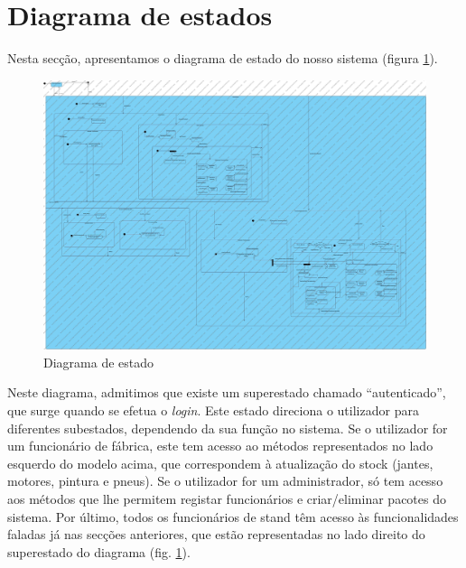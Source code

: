 \section{Diagrama de estados}

Nesta secção, apresentamos o diagrama de estado do nosso sistema (figura \ref{fig:diagrama_de_estado}).

\begin{figure}[h]
    \centering
    \includegraphics[width=\textwidth]{analise_de_requisitos/49461754_398655354223097_8464874533138989056_n.jpg}
    \caption{Diagrama de estado}
    \label{fig:diagrama_de_estado}
\end{figure}


Neste diagrama, admitimos que existe um superestado chamado “autenticado”, que surge quando se efetua o \textit{login}. Este estado direciona o utilizador para diferentes subestados, dependendo da sua função no sistema. Se o utilizador for um funcionário de fábrica, este tem acesso ao métodos representados no lado esquerdo do modelo acima, que correspondem à atualização do stock (jantes, motores, pintura e pneus). Se o utilizador for um administrador, só tem acesso aos métodos que lhe permitem registar funcionários e criar/eliminar pacotes do sistema. Por último, todos os funcionários de stand têm acesso às funcionalidades faladas já nas secções anteriores, que estão representadas no lado direito do superestado do diagrama (fig. \ref{fig:diagrama_de_estado}).


\clearpage